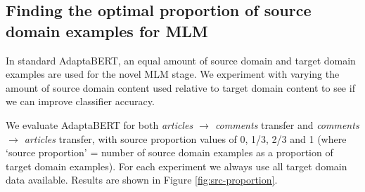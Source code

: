 \subsection{Finding the optimal proportion of source domain examples for MLM} \label{subsec:src-proportion-adaptabert}

In standard AdaptaBERT, an equal amount of source domain and target domain examples are used for the novel MLM stage. We experiment with varying the amount of source domain content used relative to target domain content to see if we can improve classifier accuracy.

We evaluate AdaptaBERT for both \textit{articles $ \rightarrow $ comments} transfer and \textit{comments $ \rightarrow $ articles} transfer, with source proportion values of 0, 1/3, 2/3 and 1 (where `source proportion' = number of source domain examples as a proportion of target domain examples). For each experiment we always use all target domain data available. Results are shown in Figure \ref{fig:src-proportion}.

